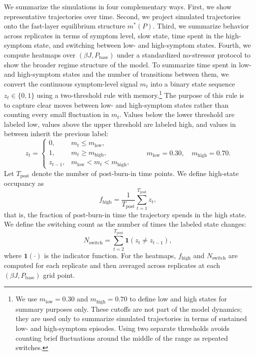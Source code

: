 \documentclass[man,12pt,floatsintext]{apa7}
\begin{document}
We summarize the simulations in four complementary ways. First, we show representative trajectories over time. Second, we project simulated trajectories onto the fast-layer equilibrium structure \(m^*(P)\). Third, we summarize behavior across replicates in terms of symptom level, slow state, time spent in the high-symptom state, and switching between low- and high-symptom states. Fourth, we compute heatmaps over \((\beta J, P_{\text{base}})\) under a standardized no-stressor protocol to show the broader regime structure of the model.
To summarize time spent in low- and high-symptom states and the number of transitions between them, we convert the continuous symptom-level signal \(m_t\) into a binary state sequence \(z_t\in\{0,1\}\) using a two-threshold rule with memory.\footnote{We use \(m_{\mathrm{low}}=0.30\) and \(m_{\mathrm{high}}=0.70\) to define low and high states for summary purposes only. These cutoffs are not part of the model dynamics; they are used only to summarize simulated trajectories in terms of sustained low- and high-symptom episodes. Using two separate thresholds avoids counting brief fluctuations around the middle of the range as repeated switches.} The purpose of this rule is to capture clear moves between low- and high-symptom states rather than counting every small fluctuation in \(m_t\). Values below the lower threshold are labeled low, values above the upper threshold are labeled high, and values in between inherit the previous label:
\[
z_t=
\begin{cases}
0, & m_t \le m_{\mathrm{low}},\\[4pt]
1, & m_t \ge m_{\mathrm{high}},\\[4pt]
z_{t-1}, & m_{\mathrm{low}} < m_t < m_{\mathrm{high}},
\end{cases}
\qquad
m_{\mathrm{low}}=0.30,\quad m_{\mathrm{high}}=0.70.
\]
\noindent Let \(T_{\mathrm{post}}\) denote the number of post-burn-in time points. We define high-state occupancy as
\[
f_{\mathrm{high}}
=
\frac{1}{T_{\mathrm{post}}}\sum_{t=1}^{T_{\mathrm{post}}} z_t,
\]
that is, the fraction of post-burn-in time the trajectory spends in the high state.
\noindent We define the switching count as the number of times the labeled state changes:
\[
N_{\mathrm{switch}}
=
\sum_{t=2}^{T_{\mathrm{post}}} \mathbf{1}\!\left(z_t \neq z_{t-1}\right),
\]
where \(\mathbf{1}(\cdot)\) is the indicator function. For the heatmaps, \(f_{\mathrm{high}}\) and \(N_{\mathrm{switch}}\) are computed for each replicate and then averaged across replicates at each \((\beta J, P_{\text{base}})\) grid point.
\end{document}
